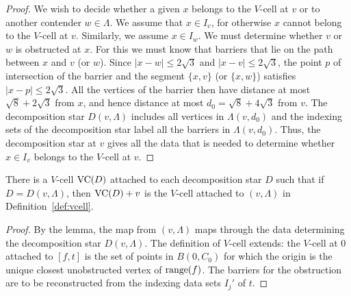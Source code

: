 \begin{proof}
We wish to decide whether a given $x$ belongs to the $V$-cell at
$v$ or to another contender $w\in\Lambda$.  We assume that $x\in
I_v$, for otherwise $x$ cannot belong to the $V$-cell at $v$.
Similarly, we assume $x\in I_w$.  We must determine whether $v$ or
$w$ is obstructed at $x$.  For this we must know that barriers
that lie on the path between $x$ and $v$ (or $w$).  Since
$|x-w|\le2\sqrt3$ and $|x-v|\le2\sqrt3$, the point $p$ of
intersection of the barrier and the segment $\{x,v\}$ (or
$\{x,w\}$) satisfies $|x-p|\le2\sqrt3$.  All the vertices of the
barrier then have distance at most $\sqrt8+2\sqrt3$ from $x$, and
hence distance at most $d_0=\sqrt8+4\sqrt3$ from $v$.  The
decomposition star $D(v,\Lambda)$ includes all vertices in
$\Lambda(v,d_0)$ and the indexing sets of the decomposition star
label all the barriers in $\Lambda(v,d_0)$.  Thus, the
decomposition star at $v$ gives all the data that is needed to
determine whether $x\in I_v$ belongs to the $V$-cell at $v$.
%
\end{proof}

\begin{corollary} There is a $V$-cell ${\operatorname{VC}}(D)$ attached to each
decomposition star $D$ such that if $D=D(v,\Lambda)$, then
   ${\operatorname{VC}}(D)+v$ is the $V$-cell attached to $(v,\Lambda)$ in
   Definition~\ref{def:vcell}.
\end{corollary}

\begin{proof}  By the lemma, the map from $(v,\Lambda)$ maps
through the data determining the decomposition star
$D(v,\Lambda)$.   The definition of $V$-cell extends: the $V$-cell
at $0$ attached to $[f,t]$ is the set of points in $B(0,C_0)$ for
which the origin is the unique closest unobstructed vertex of
${\operatorname{range}}(f)$.  The barriers for the obstruction are to be
reconstructed from the indexing data sets $I_j'$ of $t$.
\end{proof}

